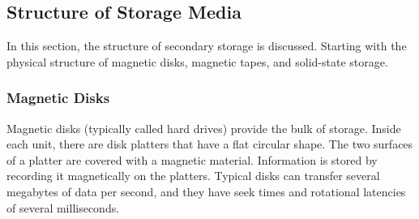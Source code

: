 \subsection{Structure of Storage Media}\label{subsec:Structure_Storage_Media}
In this section, the structure of secondary storage is discussed.
Starting with the physical structure of magnetic disks, magnetic tapes, and solid-state storage.

\subsubsection{Magnetic Disks}\label{subsubsec:Magnetic_Disks}
Magnetic disks (typically called hard drives) provide the bulk of storage.
Inside each unit, there are disk platters that have a flat circular shape.
The two surfaces of a platter are covered with a magnetic material.
Information is stored by recording it magnetically on the platters.
Typical disks can transfer several megabytes of data per second, and they have seek times and rotational latencies of several milliseconds.


